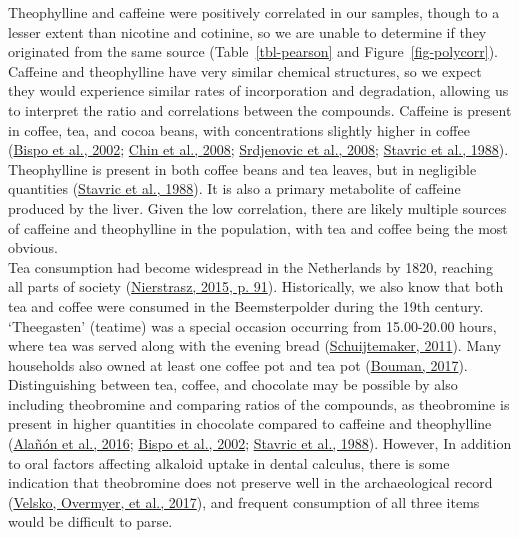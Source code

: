 \documentclass[
  letterpaper,
]{book}
\begin{document}
Theophylline and caffeine were positively correlated in our samples,
though to a lesser extent than nicotine and cotinine, so we are unable
to determine if they originated from the same source
(Table~\ref{tbl-pearson} and Figure~\ref{fig-polycorr}). Caffeine and
theophylline have very similar chemical structures, so we expect they
would experience similar rates of incorporation and degradation,
allowing us to interpret the ratio and correlations between the
compounds. Caffeine is present in coffee, tea, and cocoa beans, with
concentrations slightly higher in coffee
(\protect\hyperlink{ref-bispoSimultaneousDetermination2002}{Bispo et
al., 2002}; \protect\hyperlink{ref-chinCaffeineContent2008}{Chin et al.,
2008}; \protect\hyperlink{ref-srdjenovicSimultaneousHPLC2008}{Srdjenovic
et al., 2008};
\protect\hyperlink{ref-stavricVariabilityCaffeine1988}{Stavric et al.,
1988}). Theophylline is present in both coffee beans and tea leaves, but
in negligible quantities
(\protect\hyperlink{ref-stavricVariabilityCaffeine1988}{Stavric et al.,
1988}). It is also a primary metabolite of caffeine produced by the
liver. Given the low correlation, there are likely multiple sources of
caffeine and theophylline in the population, with tea and coffee being
the most obvious.\\
Tea consumption had become widespread in the Netherlands by 1820,
reaching all parts of society
(\protect\hyperlink{ref-nierstraszTeaTrade2015}{Nierstrasz, 2015, p.
91}). Historically, we also know that both tea and coffee were consumed
in the Beemsterpolder during the 19th century. `Theegasten' (teatime)
was a special occasion occurring from 15.00-20.00 hours, where tea was
served along with the evening bread
(\protect\hyperlink{ref-schuijtemakerTeTheegasten2011}{Schuijtemaker,
2011}). Many households also owned at least one coffee pot and tea pot
(\protect\hyperlink{ref-boumanBegravenis2017}{Bouman, 2017}).
Distinguishing between tea, coffee, and chocolate may be possible by
also including theobromine and comparing ratios of the compounds, as
theobromine is present in higher quantities in chocolate compared to
caffeine and theophylline
(\protect\hyperlink{ref-alanonAssessmentFlavanol2016}{Alañón et al.,
2016}; \protect\hyperlink{ref-bispoSimultaneousDetermination2002}{Bispo
et al., 2002};
\protect\hyperlink{ref-stavricVariabilityCaffeine1988}{Stavric et al.,
1988}). However, In addition to oral factors affecting alkaloid uptake
in dental calculus, there is some indication that theobromine does not
preserve well in the archaeological record
(\protect\hyperlink{ref-velskoDentalCalculus2017}{Velsko, Overmyer, et
al., 2017}), and frequent consumption of all three items would be
difficult to parse.
\end{document}
